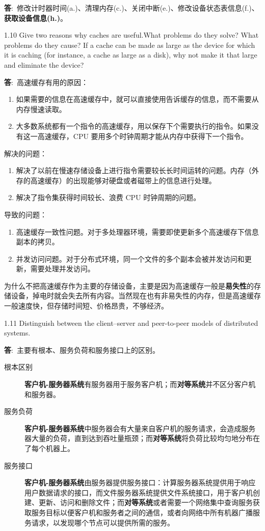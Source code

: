 \documentclass[12pt,a4paper]{article}
\newenvironment{problems}{\begin{list}{}{\renewcommand{\makelabel}[1]{\textbf{##1}\hfil}}}{\end{list}}
\providecommand{\ans}{\textbf{答}:~}
\begin{document}
\begin{problems}
    \ans 修改计时器时间(a.)、清理内存(c.)、关闭中断(e.)、修改设备状态表信息(f.)、\textbf{获取设备信息(h.)}。
    \item[1.10] Give two reasons why caches are useful.What problems do they solve?
    What problems do they cause? If a cache can be made as large as the device for which it is caching (for instance, a cache as large as a disk),
    why not make it that large and eliminate the device?

    \ans 高速缓存有用的原因：
    \begin{enumerate}
        \item 如果需要的信息在高速缓存中，就可以直接使用告诉缓存的信息，而不需要从内存慢速读取。
        \item 大多数系统都有一个指令的高速缓存，用以保存下个需要执行的指令。如果没有这一高速缓存，CPU 要用多个时钟周期才能从内存中获得下一个指令。
    \end{enumerate}

    解决的问题：
    \begin{enumerate}
        \item 解决了以前在慢速存储设备上进行指令需要较长长时间运转的问题。内存（外存的高速缓存）的出现能够对硬盘或者磁带上的信息进行处理。
        \item 解决了指令集获得时间较长、浪费 CPU 时钟周期的问题。
    \end{enumerate}

    导致的问题：
    \begin{enumerate}
        \item 高速缓存一致性问题。对于多处理器环境，需要即使更新多个高速缓存下信息副本的拷贝。
        \item 并发访问问题。对于分布式环境，同一个文件的多个副本会被并发访问和更新，需要处理并发访问。
    \end{enumerate}

    为什么不把高速缓存作为主要的存储设备，主要是因为高速缓存一般是\textbf{易失性}的存储设备，掉电时就会失去所有内容。当然现在也有非易失性的内存，但是高速缓存一般速度快，但存储时间短、价格昂贵，不够经济。
    \item[1.11] Distinguish between the client–server and peer-to-peer models of distributed
    systems.

    \ans 主要有根本、服务负荷和服务接口上的区别。
    \begin{description}
        \item[根本区别] \textbf{客户机-服务器系统}有服务器用于服务客户机；而\textbf{对等系统}并不区分客户机和服务器。
        \item[服务负荷] \textbf{客户机-服务器系统}中服务器会有大量来自客户机的服务请求，会造成服务器大量的负荷，直到达到吞吐量瓶颈；而\textbf{对等系统}将负荷比较均匀地分布在了每个机器上。
        \item[服务接口] \textbf{客户机-服务器系统}由服务器提供服务接口：计算服务器系统提供用于响应用户数据请求的接口，而文件服务器系统提供文件系统接口，用于客户机创建、更新、访问和删除文件；而\textbf{对等系统}或者需要一个网络集中查询服务获取服务目标以便客户机和服务者之间的通信，或者向网络中所有机器广播服务请求，以发现哪个节点可以提供所需的服务。
    \end{description}
    

\end{problems}
\end{document}
